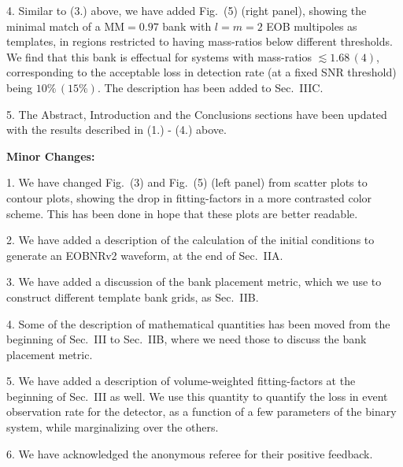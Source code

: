 \documentclass[a4paper,10pt]{article}
\begin{document}
4. Similar to (3.) above, we have added Fig.~(5) (right panel), showing the minimal
match of a MM$=0.97$ bank with $l=m=2$ EOB multipoles as templates, in regions
restricted to having mass-ratios below different thresholds. We find that this
bank is effectual for systems with mass-ratios $\lesssim 1.68\,(4)$, corresponding
to the acceptable loss in detection rate (at a fixed SNR threshold) being
$10\%\,(15\%)$.
The description has been added to Sec.~IIIC.
\newline

5. The Abstract, Introduction and the Conclusions sections have been updated
with the results described in (1.) - (4.) above.
\newline

\textbf{Minor Changes:}
\newline

1. We have changed Fig.~(3) and Fig.~(5) (left panel) from scatter plots to 
contour plots, showing the drop in fitting-factors in a more contrasted 
color scheme.  This has been done in hope that these plots are better readable.
\newline

2. We have added a description of the calculation of the initial conditions
to generate an EOBNRv2 waveform, at the end of Sec.~IIA.
\newline

3. We have added a discussion of the bank placement metric, which we use to 
construct different template bank grids, as Sec.~IIB.
\newline

4. Some of the description of mathematical quantities has been moved from the
beginning of Sec.~III to Sec.~IIB, where we need those to discuss the bank 
placement metric.
\newline

5. We have added a description of volume-weighted fitting-factors at the beginning
of Sec.~III as well. We use this quantity to quantify the loss in event 
observation rate for the detector, as a function of a few parameters of the binary
system, while marginalizing over the others.
\newline

6. We have acknowledged the anonymous referee for their positive feedback.
\end{document}
